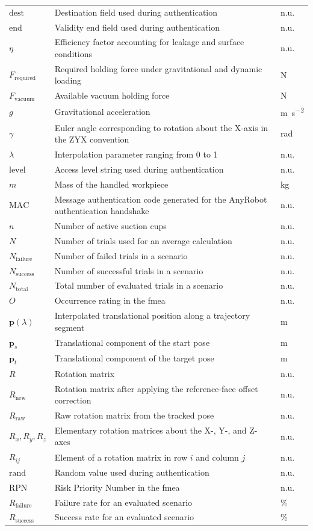 {\begin{longtable}{@{}L{3.0cm}L{9.8cm}L{2.2cm}@{}}
    $\text{dest}$ & Destination field used during authentication & n.u.\tabularnewline
    $\text{end}$ & Validity end field used during authentication & n.u.\tabularnewline
    $\eta$ & Efficiency factor accounting for leakage and surface conditions & n.u.\tabularnewline
    $F_{\text{required}}$ & Required holding force under gravitational and dynamic loading & \si{\newton}\tabularnewline
    $F_{\text{vacuum}}$ & Available vacuum holding force & \si{\newton}\tabularnewline
    $g$ & Gravitational acceleration & \si{\metre\per\square\second}\tabularnewline
    $\gamma$ & Euler angle corresponding to rotation about the X-axis in the ZYX convention & \si{\radian}\tabularnewline
    $\lambda$ & Interpolation parameter ranging from 0 to 1 & n.u.\tabularnewline
    $\text{level}$ & Access level string used during authentication & n.u.\tabularnewline
    $m$ & Mass of the handled workpiece & \si{\kilogram}\tabularnewline
    $\mathrm{MAC}$ & Message authentication code generated for the AnyRobot authentication handshake & n.u.\tabularnewline
    $n$ & Number of active suction cups & n.u.\tabularnewline
    $N$ & Number of trials used for an average calculation & n.u.\tabularnewline
    $N_{\mathrm{failure}}$ & Number of failed trials in a scenario & n.u.\tabularnewline
    $N_{\mathrm{success}}$ & Number of successful trials in a scenario & n.u.\tabularnewline
    $N_{\mathrm{total}}$ & Total number of evaluated trials in a scenario & n.u.\tabularnewline
    $O$ & Occurrence rating in the \acs{fmea} & n.u.\tabularnewline
    $\mathbf{p}(\lambda)$ & Interpolated translational position along a trajectory segment & \si{\metre}\tabularnewline
    $\mathbf{p}_s$ & Translational component of the start pose & \si{\metre}\tabularnewline
    $\mathbf{p}_t$ & Translational component of the target pose & \si{\metre}\tabularnewline
    $R$ & Rotation matrix & n.u.\tabularnewline
    $R_{\text{new}}$ & Rotation matrix after applying the reference-face offset correction & n.u.\tabularnewline
    $R_{\text{raw}}$ & Raw rotation matrix from the tracked pose & n.u.\tabularnewline
    $R_x, R_y, R_z$ & Elementary rotation matrices about the X-, Y-, and Z-axes & n.u.\tabularnewline
    $R_{ij}$ & Element of a rotation matrix in row $i$ and column $j$ & n.u.\tabularnewline
    $\text{rand}$ & Random value used during authentication & n.u.\tabularnewline
    $\mathrm{RPN}$ & Risk Priority Number in the \acs{fmea} & n.u.\tabularnewline
    $R_{\mathrm{failure}}$ & Failure rate for an evaluated scenario & \si{\percent}\tabularnewline
    $R_{\mathrm{success}}$ & Success rate for an evaluated scenario & \si{\percent}\tabularnewline

\end{longtable}}
